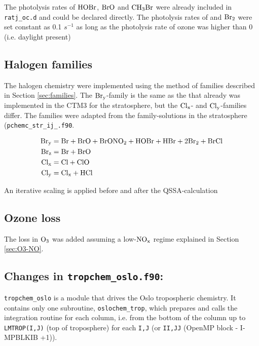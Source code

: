 The photolysis rates of $\mathrm{HOBr}$, $\mathrm{BrO}$ and $\mathrm{CH_3Br}$ were already included in \texttt{ratj\_oc.d} and could be declared directly. The photolysis rates of  and $\mathrm{Br_2}$ were set constant as 0.1 $s^{-1}$ as long as the photolysis rate of ozone was higher than 0 (i.e. daylight present)


\subsection{Halogen families}\label{sec:halogen_families_BryClxCly}

The halogen chemistry were implemented using the method of families described in Section \ref{sec:families}. The $\mathrm{Br_y}$-family is the same as the that already was implemented in the CTM3 for the stratosphere, but the $\mathrm{Cl_x}$- and $\mathrm{Cl_y}$-families differ. The families were adapted from the family-solutions in the stratosphere (\texttt{pchemc\_str\_ij\_.f90}. 
 
\begin{align*}
    \mathrm{Br_y} &= \mathrm{Br} + \mathrm{BrO} + \mathrm{BrONO_2} + \mathrm{HOBr} + \mathrm{HBr} + 2\mathrm{Br_2} + \mathrm{BrCl} \\
    \mathrm{Br_z} & = \mathrm{Br} + \mathrm{BrO} \\
    \mathrm{Cl_x} &= \mathrm{Cl} + \mathrm{ClO} \\
    \mathrm{Cl_y} &= \mathrm{Cl_x} + \mathrm{HCl}
\end{align*}

An iterative scaling is applied before and after the QSSA-calculation



\subsection{Ozone loss}


The loss in $\mathrm{O_3}$ was added assuming a low-$\mathrm{NO_x}$ regime explained in Section \ref{sec:O3-NO}.

\subsection{Changes in \texttt{tropchem\_oslo.f90}:}\label{sec:tropchem_oslo}

\texttt{tropchem\_oslo} is a module that drives the Oslo tropospheric chemistry. It contains only one subroutine, \texttt{oslochem\_trop}, which prepares and calls the integration routine for each column, i.e. from the bottom of the column up to \texttt{LMTROP(I,J)} (top of troposphere) for each \texttt{I,J} (or \texttt{II,JJ} (OpenMP block - I-MPBLKIB +1)). 

